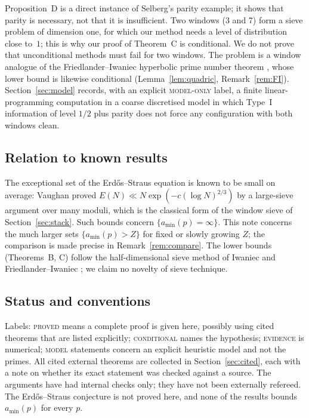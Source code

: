 \documentclass[11pt,reqno]{amsart}
\theoremstyle{definition}
\newcommand{\amin}{a_{\min}}
\newcommand{\status}[1]{\textup{\textsc{#1}}}
\begin{document}
Proposition~D is a direct instance of Selberg's parity example; it shows
that parity is necessary, not that it is insufficient.  Two windows (3
and 7) form a sieve problem of dimension one, for which our method needs
a level of distribution close to~$1$; this is why our proof of
Theorem~C is conditional.  We do not prove that unconditional methods
must fail for two windows.  The problem is a window analogue of the
Friedlander--Iwaniec hyperbolic prime number theorem \cite{FI09}, whose
lower bound is likewise conditional (Lemma~\ref{lem:quadric},
Remark~\ref{rem:FI}).  Section~\ref{sec:model} records, with an explicit
\status{model-only} label, a finite linear-programming computation in a
coarse discretised model in which Type~I information of level $1/2$ plus
parity does not force any configuration with both windows clean.

\subsection{Relation to known results}
The exceptional set of the Erd\H{o}s--Straus equation is known to be
small on average: Vaughan \cite{Vaughan} proved
$E(N)\ll N\exp(-c(\log N)^{2/3})$ by a large-sieve argument over many
moduli, which is the classical form of the window sieve of
Section~\ref{sec:stack}.  Such bounds concern $\{\amin(p)=\infty\}$.  This
note concerns the much larger sets $\{\amin(p)>Z\}$ for fixed or slowly
growing $Z$; the comparison is made precise in Remark~\ref{rem:compare}.
The lower bounds (Theorems~B, C) follow the half-dimensional sieve
method of Iwaniec \cite{Iw76} and Friedlander--Iwaniec \cite{FI09}; we
claim no novelty of sieve technique.

\subsection{Status and conventions}
Labels: \status{proved} means a complete proof is given here, possibly
using cited theorems that are listed explicitly; \status{conditional}
names the hypothesis; \status{evidence} is numerical; \status{model}
statements concern an explicit heuristic model and not the primes.  All
cited external theorems are collected in Section~\ref{sec:cited}, each with a
note on whether its exact statement was checked against a source.  The
arguments have had internal checks only; they have not been externally
refereed.  The Erd\H{o}s--Straus conjecture is not proved here, and
none of the results bounds $\amin(p)$ for every $p$.
\end{document}
